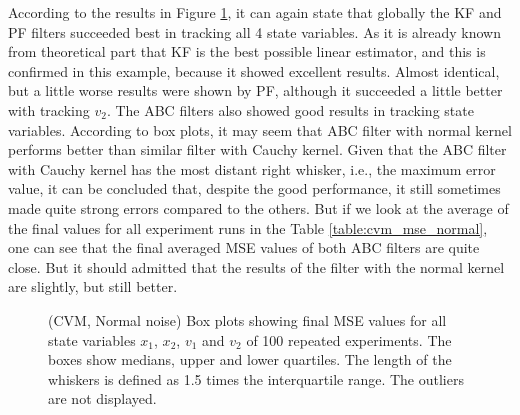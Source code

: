 According to the results in Figure \ref{fig:cvm_mse_boxplot_normal}, it can again state that globally the KF and PF filters succeeded best in tracking all 4 state variables. As it is already known from theoretical part that KF is the best possible linear estimator, and this is confirmed in this example, because it showed excellent results. Almost identical, but a little worse results were shown by PF, although it succeeded a little better with tracking \(v_2\). The ABC filters also showed good results in tracking state variables. According to box plots, it may seem that ABC filter with normal kernel performs better than similar filter with Cauchy kernel. Given that the ABC filter with Cauchy kernel has the most distant right whisker, i.e., the maximum error value, it can be concluded that, despite the good performance, it still sometimes made quite strong errors compared to the others. 
But if we look at the average of the final values for all experiment runs in the Table \ref{table:cvm_mse_normal}, one can see that the final averaged MSE values of both ABC filters are quite close. But it should admitted that the results of the filter with the normal kernel are slightly, but still better.

\begin{figure}[!ht]
\centering
\caption{(CVM, Normal noise) Box plots showing final MSE values for all state variables $x_1$, $x_2$, $v_1$ and $v_2$ of 100 repeated experiments. The boxes show medians, upper and lower quartiles. The length of the whiskers is defined as 1.5 times the interquartile range. The outliers are not displayed.}
\label{fig:cvm_mse_boxplot_normal}
\end{figure}

